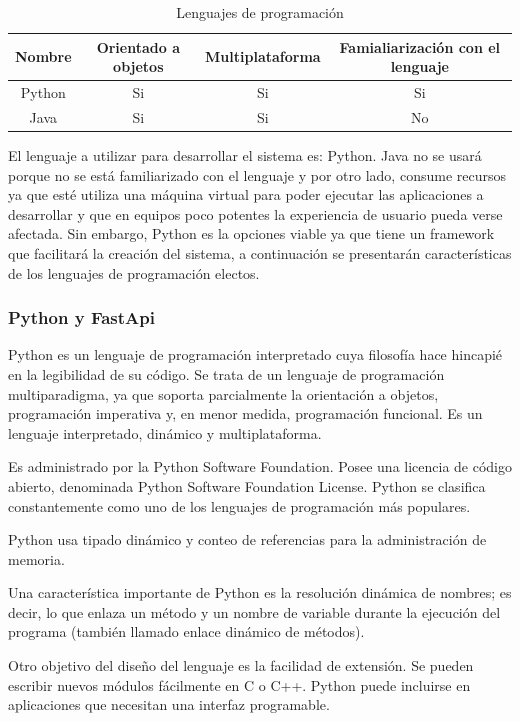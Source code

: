 \begin{table}[!htb]
\begin{tabular}{|c|c|c|c|}
\hline
\rowcolor[HTML]{3531FF} 
{\color[HTML]{FFFFFF} Nombre} & {\color[HTML]{FFFFFF} Orientado a objetos} & {\color[HTML]{FFFFFF} Multiplataforma} & {\color[HTML]{FFFFFF} Famialiarización con el lenguaje} \\ \hline
Python & Si & Si & Si \\ \hline
Java & Si & Si & No \\ \hline
\end{tabular}
\caption{Lenguajes de programación}
\label{table:Programacion}
\end{table}
El lenguaje a utilizar para desarrollar el sistema es: Python. Java no se usará porque no se está familiarizado con el lenguaje y por otro lado, consume recursos ya que esté utiliza una máquina virtual para poder ejecutar las aplicaciones a desarrollar y que en equipos poco potentes la experiencia de usuario pueda verse afectada. Sin embargo, Python es la opciones viable ya que tiene  un framework que facilitará la creación del sistema, a continuación se presentarán características de los lenguajes de programación electos.

\subsubsection{Python y FastApi}
Python es un lenguaje de programación interpretado cuya filosofía hace hincapié en la legibilidad de su código. Se trata de un lenguaje de programación multiparadigma, ya que soporta parcialmente la orientación a objetos, programación imperativa y, en menor medida, programación funcional. Es un lenguaje interpretado, dinámico y multiplataforma. \cite{LUCADecisions}

Es administrado por la Python Software Foundation. Posee una licencia de código abierto, denominada Python Software Foundation License. Python se clasifica constantemente como uno de los lenguajes de programación más populares.

Python usa tipado dinámico y conteo de referencias para la administración de memoria.

Una característica importante de Python es la resolución dinámica de nombres; es decir, lo que enlaza un método y un nombre de variable durante la ejecución del programa (también llamado enlace dinámico de métodos).

Otro objetivo del diseño del lenguaje es la facilidad de extensión. Se pueden escribir nuevos módulos fácilmente en C o C++. Python puede incluirse en aplicaciones que necesitan una interfaz programable.

